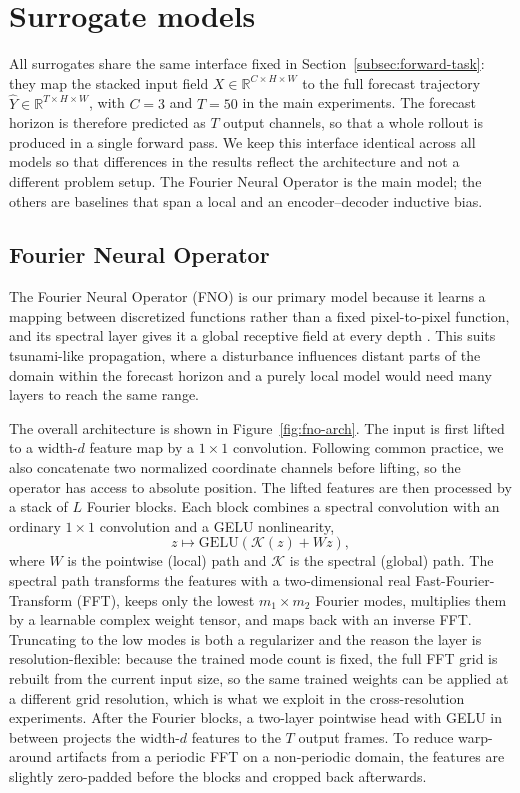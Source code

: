 \section{Surrogate models}
\label{sec:models}

All surrogates share the same interface fixed in Section~\ref{subsec:forward-task}: they map the stacked input field $X\in\mathbb{R}^{C \times H \times W}$ to the full forecast trajectory $\widehat{Y}\in\mathbb{R}^{T \times H \times W}$, with $C=3$ and $T=50$ in the main experiments. The forecast horizon is therefore predicted as $T$ output channels, so that a whole rollout is produced in a single forward pass. We keep this interface identical across all models so that differences in the results reflect the architecture and not a different problem setup. The Fourier Neural Operator is the main model; the others are baselines that span a local and an encoder--decoder inductive bias.

\subsection{Fourier Neural Operator}
\label{subsec:fno}

The Fourier Neural Operator (FNO) is our primary model because it learns a mapping between discretized functions rather than a fixed pixel-to-pixel function, and its spectral layer gives it a global receptive field at every depth \citep{li2021fno}. This suits tsunami-like propagation, where a disturbance influences distant parts of the domain within the forecast horizon and a purely local model would need many layers to reach the same range.

The overall architecture is shown in Figure~\ref{fig:fno-arch}. The input is first lifted to a width-$d$ feature map by a $1 \times 1$ convolution. Following common practice, we also concatenate two normalized coordinate channels before lifting, so the operator has access to absolute position. The lifted features are then processed by a stack of $L$ Fourier blocks. Each block combines a spectral convolution with an ordinary $1 \times 1$ convolution and a GELU nonlinearity,
\[
z \mapsto \mathrm{GELU} \!\left(\mathcal{K}(z) + W z \right),
\]
where $W$ is the pointwise (local) path and $\mathcal{K}$ is the spectral (global) path. The spectral path transforms the features with a two-dimensional real Fast-Fourier-Transform (FFT), keeps only the lowest $m_1 \times m_2$ Fourier modes, multiplies them by a learnable complex weight tensor, and maps back with an inverse FFT. Truncating to the low modes is both a regularizer and the reason the layer is resolution-flexible: because the trained mode count is fixed, the full FFT grid is rebuilt from the current input size, so the same trained weights can be applied at a different grid resolution, which is what we exploit in the cross-resolution experiments. After the Fourier blocks, a two-layer pointwise head with GELU in between projects the width-$d$ features to the $T$ output frames. To reduce warp-around artifacts from a periodic FFT on a non-periodic domain, the features are slightly zero-padded before the blocks and cropped back afterwards.

